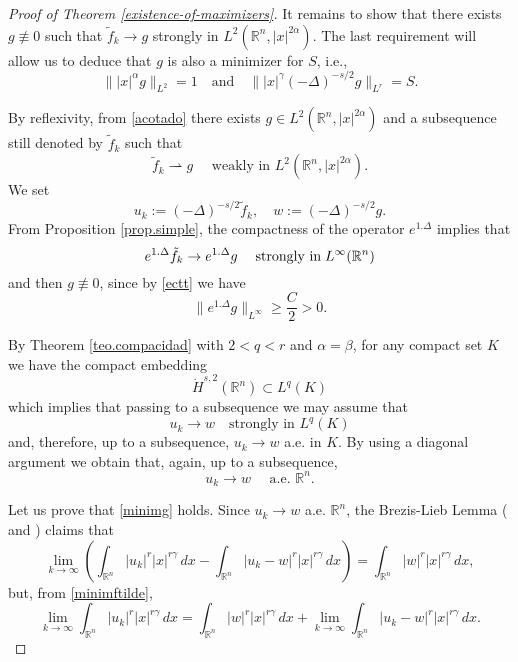 \documentclass[12pt]{amsart}
\newcommand {\R}{\mathbb{R}}
\begin{document}
\begin{proof}[Proof of Theorem \ref{existence-of-maximizers}]
	
	It remains to show that there exists $g\not\equiv 0$ such that $\tilde f_k\to g$ strongly in $L^2(\R^n,|x|^{2\alpha  })$. The last requirement will allow us to deduce that $g$ is also a minimizer for $S$, i.e., 
	\begin{equation}  \label{minimg}
		\| |x|^\alpha    g \|_{L^2} = 1  \quad\mbox{and}\quad \| |x|^\gamma  (-\Delta)^{-s/2}   g \|_{L^r} = S .
	\end{equation}	
	
	By reflexivity, from \eqref{acotado} there exists $g\in L^2(\R^n,|x|^{2\alpha  })$ and a subsequence still denoted by $\tilde f_k$ such that 
	\begin{equation} \label{conv.debil}
		\tilde{f}_{k} \rightharpoonup g \quad \mbox{ weakly in } L^2(\R^n, |x|^{ 2\alpha  }).
	\end{equation}
	We set
	$$
		u_k := (-\Delta)^{-s/2} \tilde f_k, \quad w := (-\Delta)^{-s/2} g.
	$$
	From Proposition \ref{prop.simple},   the compactness of the operator $e^{1.\Delta}$ implies that
	$$ e^{1.\Delta} \tilde{f}_{k} \to e^{1.\Delta} g \;\quad  \hbox{strongly in} \; L^\infty(\R^n) $$
	and then $g\not\equiv 0$, since by \eqref{ectt} we have
	$$
		 \| e^{1.\Delta} g \|_{L^\infty} \geq \frac{C}{2} > 0.
	$$
	
	By Theorem \ref{teo.compacidad} with $2<q<r$ and $\alpha=\beta$, for any compact set $K$ we have 	the compact embedding 
	$$ 
		\dot{H}^{s,2}(\R^n) \subset L^{q}(K) 
	$$
	which implies that passing to a subsequence we may assume that
	$$ 
		u_{k} \to w \quad \mbox{strongly in } L^q(K)
	$$
	and, therefore, up to a subsequence,  $u_{k} \to w $ a.e. in $K$. By using a diagonal argument we obtain that, again, up to a subsequence, 
	\begin{equation} \label{conve}
		u_k \to w \quad \mbox{ a.e. } \R^n.
	\end{equation}
	
	Let us prove that \eqref{minimg} holds. 	Since $u_k\to w$ a.e. $\R^n$, the Brezis-Lieb Lemma (\cite[Lemma 2.6]{Lieb} and \cite{Brezis-Lieb}) claims that
	$$
		\lim_{k\to\infty}\left( \int_{\R^n} |u_k|^r |x|^{r\gamma}\,dx - \int_{\R^n} |u_k -w |^r |x|^{r\gamma}\,dx \right) = \int_{\R^n} |w|^r |x|^{r\gamma}\,dx,
	$$
	but, from \eqref{minimftilde},
	\begin{equation} \label{BL}
		\lim_{k\to\infty} \int_{\R^n} |u_k|^r |x|^{r\gamma}\,dx  =   \int_{\R^n} |w|^r |x|^{r\gamma}\,dx  + \lim_{k\to\infty}  \int_{\R^n} |u_k -w |^r |x|^{r\gamma}\,dx.	
	\end{equation}
	

\end{proof}
\end{document}
